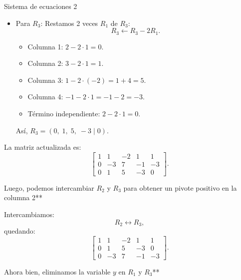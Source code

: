 \documentclass[11pt,letterpaper]{article}
\begin{document}
\begin{inciso}{Sistema de ecuaciones 2}
\begin{itemize}
      \begin{itemize}
        \item Columna 1: \(3 - 3\cdot1 = 0\).
        \item Columna 2: \(0 - 3\cdot1 = -3\).
        \item Columna 3: \(1 - 3\cdot(-2) = 1 + 6 = 7\).
        \item Columna 4: \(2 - 3\cdot1 = 2 - 3 = -1\).
        \item Término independiente: \(0 - 3\cdot1 = -3\).
      \end{itemize}
    
      Así, \(R_2 = (0,\;-3,\;7,\;-1 \;|\;-3)\).
    
    \item Para \(R_3\):  
      Restamos 2 veces \(R_1\) de \(R_3\):
      \[
      R_3 \leftarrow R_3 - 2R_1.
      \]
    \begin{itemize}
        \item Columna 1: \(2 - 2\cdot1 = 0\).
        \item Columna 2: \(3 - 2\cdot1 = 1\).
        \item Columna 3: \(1 - 2\cdot(-2) = 1 + 4 = 5\).
        \item Columna 4: \(-1 - 2\cdot1 = -1 - 2 = -3\).
        \item Término independiente: \(2 - 2\cdot1 = 0\).
    \end{itemize}
    
      Así, \(R_3 = (0,\;1,\;5,\;-3 \;|\;0)\).
    
\end{itemize}


La matriz actualizada es:
\[
\left[\begin{array}{cccc|c}
1 & 1 & -2 & 1 & 1 \\
0 & -3 & 7 & -1 & -3 \\
0 & 1 & 5 & -3 & 0
\end{array}\right].
\]

Luego, podemos intercambiar \(R_2\) y \(R_3\) para obtener un pivote positivo en la columna 2**

Intercambiamos:
\[
R_2 \leftrightarrow R_3,
\]
quedando:
\[
\left[\begin{array}{cccc|c}
1 & 1 & -2 & 1 & 1 \\
0 & 1 & 5 & -3 & 0 \\
0 & -3 & 7 & -1 & -3
\end{array}\right].
\]

Ahora bien, eliminamos la variable \(y\) en \(R_1\) y \(R_3\)**


\end{inciso}
\end{document}
